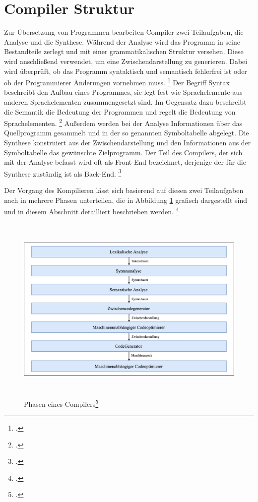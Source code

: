 \section{Compiler Struktur}
Zur Übersetzung von Programmen bearbeiten Compiler zwei Teilaufgaben,  die Analyse und die Synthese. Während der Analyse wird das Programm in seine Bestandteile zerlegt und mit einer grammatikalischen Struktur versehen. Diese wird anschließend verwendet, um eine Zwischendarstellung zu generieren.  Dabei wird überprüft, ob das Programm syntaktisch und semantisch fehlerfrei ist oder ob der Programmierer Änderungen vornehmen muss. \footcite[Vgl.][S. 6f]{Ullmann2008} Der Begriff Syntax beschreibt den Aufbau eines Programmes,  sie legt fest wie Sprachelemente aus anderen Sprachelementen zusammengesetzt sind.  Im Gegensatz dazu beschreibt die Semantik die Bedeutung der Programmen und regelt die Bedeutung von Sprachelementen.  \footcite[Vgl.][S. 36]{Schneider1975}  Außerdem werden bei der Analyse Informationen über das Quellprogramm gesammelt und in der so genannten Symboltabelle abgelegt.  Die Synthese konstruiert aus der Zwischendarstellung und den Informationen aus der Symboltabelle das gewünschte Zielprogramm.  Der Teil des Compilers, der sich mit der Analyse befasst wird oft als Front-End bezeichnet, derjenige der für die Synthese zuständig ist als Back-End.  \footcite[Vgl.][S. 6f]{Ullmann2008}

Der Vorgang des Kompilieren lässt sich basierend auf diesen zwei Teilaufgaben nach \citeauthor{Ullmann2008} in mehrere Phasen unterteilen,  die in Abbildung \ref{fig:Compilerphasen} grafisch dargestellt sind und in diesem Abschnitt detailliert beschrieben werden.  \footcite[Vgl.][S. 6]{Ullmann2008}

\begin{figure}[!ht]
 \includegraphics[width=14.5cm,height=9.15cm]{Images/Compiler/Phasen.png}
 \caption[Phasen eines Compilers]{Phasen eines Compilers\protect\footcite{Ullmann2008}}
 \label{fig:Compilerphasen}
\end{figure}


